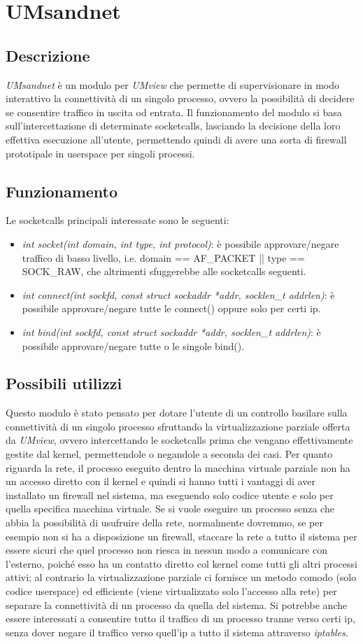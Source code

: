 \chapter{UMsandnet}
\section{Descrizione}
{\em UMsandnet} è un modulo per {\em UMview} che permette di supervisionare in modo interattivo la connettività di un singolo processo, ovvero la possibilità di decidere se consentire traffico in uscita od entrata.
Il funzionamento del modulo si basa sull'intercettazione di determinate socketcalls, lasciando la decisione della loro effettiva esecuzione all'utente, permettendo quindi di avere una sorta di firewall prototipale in userspace per singoli processi.
\section{Funzionamento}
Le socketcalls principali interessate sono le seguenti:
\begin{itemize}
\item {\em int socket(int domain, int type, int protocol)}: è possibile approvare/negare traffico di basso livello, i.e. domain == AF\_PACKET || type == SOCK\_RAW, che altrimenti sfuggerebbe alle socketcalls seguenti.
\item {\em int connect(int sockfd, const struct sockaddr *addr, socklen\_t addrlen)}: è possibile approvare/negare tutte le connect() oppure solo per certi ip.
\item {\em int bind(int sockfd, const struct sockaddr *addr, socklen\_t addrlen)}: è possibile approvare/negare tutte o le singole bind().
\end{itemize}
\section{Possibili utilizzi}
Questo modulo è stato pensato per dotare l'utente di un controllo basilare sulla connettività di un singolo processo sfruttando la virtualizzazione parziale offerta da {\em UMview}, ovvero intercettando le socketcalls prima che vengano effettivamente gestite dal kernel, permettendole o negandole a seconda dei casi. Per quanto riguarda la rete, il processo eseguito dentro la macchina virtuale parziale non ha un accesso diretto con il kernel e quindi si hanno tutti i vantaggi di aver installato un firewall nel sistema, ma eseguendo solo codice utente e solo per quella specifica macchina virtuale. Se si vuole eseguire un processo senza che abbia la possibilità di usufruire della rete, normalmente dovremmo, se per esempio non si ha a disposizione un firewall, staccare la rete a tutto il sistema per essere sicuri che quel processo non riesca in nessun modo a comunicare con l'esterno, poiché esso ha un contatto diretto col kernel come tutti gli altri processi attivi; al contrario la virtualizzazione parziale ci fornisce un metodo comodo (solo codice userspace) ed efficiente (viene virtualizzato solo l'accesso alla rete) per separare la connettività di un processo da quella del sistema.
Si potrebbe anche essere interessati a consentire tutto il traffico di un processo tranne verso certi ip, senza dover negare il traffico verso quell'ip a tutto il sistema attraverso {\em iptables}.
